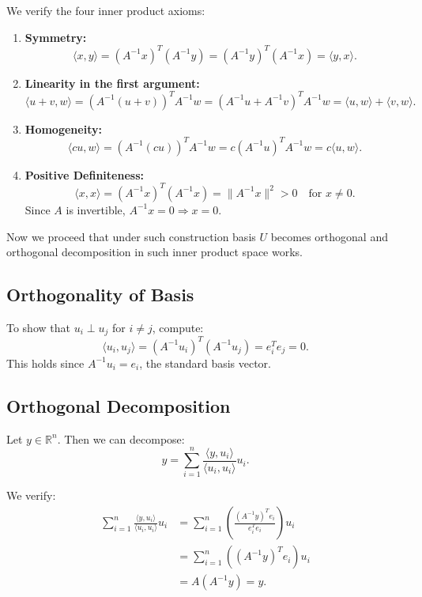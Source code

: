 \documentclass{article}
\begin{document}
We verify the four inner product axioms:

\begin{enumerate}
  \item \textbf{Symmetry:}
  \[
  \langle x, y \rangle = (A^{-1}x)^T (A^{-1}y) = (A^{-1}y)^T (A^{-1}x) = \langle y, x \rangle.
  \]

  \item \textbf{Linearity in the first argument:}
  \[
  \langle u+v, w \rangle = (A^{-1}(u+v))^T A^{-1}w = (A^{-1}u + A^{-1}v)^T A^{-1}w = \langle u, w \rangle + \langle v, w \rangle.
  \]

  \item \textbf{Homogeneity:}
  \[
  \langle cu, w \rangle = (A^{-1}(cu))^T A^{-1}w = c (A^{-1}u)^T A^{-1}w = c \langle u, w \rangle.
  \]

  \item \textbf{Positive Definiteness:}
  \[
  \langle x, x \rangle = (A^{-1}x)^T (A^{-1}x) = \|A^{-1}x\|^2 > 0 \quad \text{for } x \ne 0.
  \]
  Since \( A \) is invertible, \( A^{-1}x = 0 \Rightarrow x = 0 \).
\end{enumerate}

Now we proceed that under such construction basis $U$ becomes orthogonal and orthogonal decomposition in such inner product space works.

\subsection*{Orthogonality of Basis}

To show that \( u_i \perp u_j \) for \( i \ne j \), compute:
\[
\langle u_i, u_j \rangle = (A^{-1}u_i)^T (A^{-1}u_j) = e_i^T e_j = 0.
\]
This holds since \( A^{-1}u_i = e_i \), the standard basis vector.

\subsection*{Orthogonal Decomposition}

Let \( y \in \mathbb{R}^n \). Then we can decompose:
\[
y = \sum_{i=1}^n \frac{\langle y, u_i \rangle}{\langle u_i, u_i \rangle} u_i.
\]

We verify:
\begin{align*}
  \sum_{i=1}^n \frac{\langle y, u_i \rangle}{\langle u_i, u_i \rangle} u_i
  &= \sum_{i=1}^n \left( \frac{(A^{-1}y)^T e_i}{e_i^T e_i} \right) u_i \\
  &= \sum_{i=1}^n ((A^{-1}y)^T e_i) u_i \\
  &= A (A^{-1} y) = y.
\end{align*}
\end{document}
